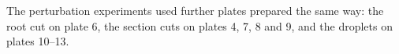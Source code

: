 
The perturbation experiments used further plates prepared the same way: the root cut on plate 6, the section cuts on plates 4, 7, 8 and 9, and the droplets on plates 10--13.


